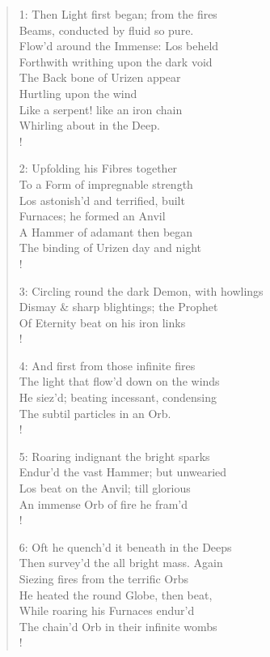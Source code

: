 \documentclass[9pt]{extarticle}
\begin{document}
\begin{verse}
\begin{altverse} 	
		
		1: Then Light first began; from the fires\\
		Beams, conducted by fluid so pure.\\
		Flow’d around the Immense: Los beheld\\
		Forthwith writhing upon the dark void\\
		The Back bone of Urizen appear\\
		Hurtling upon the wind\\
		Like a serpent! like an iron chain\\
		Whirling about in the Deep.\\!
		
		2: Upfolding his Fibres together\\
		To a Form of impregnable strength\\
		Los astonish’d and terrified, built\\
		Furnaces; he formed an Anvil\\
		A Hammer of adamant then began\\
		The binding of Urizen day and night\\!
		
		3: Circling round the dark Demon, with howlings\\
		Dismay \& sharp blightings; the Prophet\\
		Of Eternity beat on his iron links\\!
		
		4: And first from those infinite fires\\
		The light that flow’d down on the winds\\
		He siez’d; beating incessant, condensing\\
		The subtil particles in an Orb.\\!
		
		5: Roaring indignant the bright sparks\\
		Endur’d the vast Hammer; but unwearied\\
		Los beat on the Anvil; till glorious\\
		An immense Orb of fire he fram’d\\!
		
		6: Oft he quench’d it beneath in the Deeps\\
		Then survey’d the all bright mass. Again\\
		Siezing fires from the terrific Orbs\\
		He heated the round Globe, then beat,\\
		While roaring his Furnaces endur’d\\
		The chain’d Orb in their infinite wombs\\!
		

\end{altverse}
\end{verse}
\end{document}
